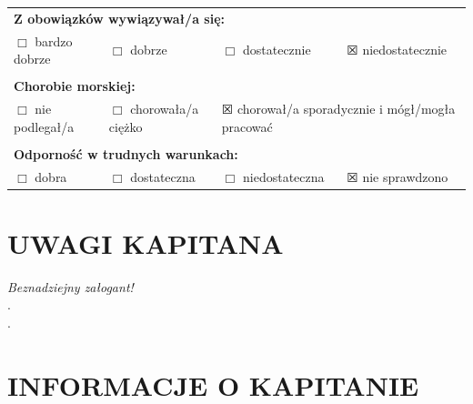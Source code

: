 \documentclass{article}
\begin{document}
\begin{tabularx}{\textwidth}{X X X X}
\multicolumn{4}{l}{\textbf{Z obowiązków wywiązywał/a się:}}\\
$\Box$ bardzo dobrze & $\Box$ dobrze & $\Box$ dostatecznie & $\XBox$ niedostatecznie\\
\\
\multicolumn{4}{l}{\textbf{Chorobie morskiej:}}\\
$\Box$ nie podlegał/a & $\Box$ chorowała/a ciężko & \multicolumn{2}{l}{$\XBox$ chorował/a sporadycznie i mógł/mogła pracować}\\
\\
\multicolumn{4}{l}{\textbf{Odporność w trudnych warunkach:}}\\
$\Box$ dobra & $\Box$ dostateczna & $\Box$ niedostateczna & $\XBox$ nie sprawdzono\\
\end{tabularx}

\section*{UWAGI KAPITANA}


\textit{Beznadziejny załogant!}\dotfill \\
.\dotfill \\
.\dotfill \\
\section*{INFORMACJE O KAPITANIE}
\end{document}
